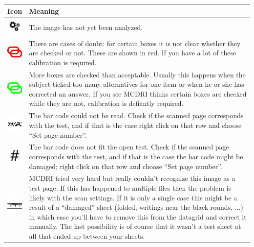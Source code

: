 \documentclass[10pt,a4paper]{article}
\newcommand{\name}{MCDRI }
\begin{document}
\begin{tabular}{l|p{}}
Icon & Meaning \\
\hline
\includegraphics{img/icons/NotAnalyzed.png} & \vspace{-20pt} The image has not yet been analyzed. \\
\includegraphics{img/icons/ContainsDoubts.png} & \vspace{-20pt} There are cases of doubt: for certain boxes it is not clear whether they are checked or not. These are shown in red. If you have a lot of these calibration is required.\\
\includegraphics{img/icons/ContainsTooManyChecked.png} & \vspace{-20pt} More boxes are checked than acceptable. Usually this happens when the subject ticked too many alternatives for one item or when he or she has corrected an answer. If you see \name thinks certain boxes are checked while they are not, calibration is defiantly required.\\
\includegraphics{img/icons/BarCodeError.png} & \vspace{-20pt} The bar code could not be read. Check if the scanned page corresponds with the test, and if that is the case right click on that row and choose ``Set page number''.\\
\includegraphics{img/icons/PageNumberOrHashError.png} & \vspace{-20pt}  The bar code does not fit the open test. Check if the scanned page corresponds with the test, and if that is the case the bar code might be damaged; right click on that row and choose ``Set page number''.\\
\includegraphics{img/icons/CalibrationError.png} & \vspace{-20pt} \name tried very hard but really couldn't recognize this image as a test page. If this has happened to multiple files then the problem is likely with the scan settings. If it is only a single case this might be a result of a ``damaged'' sheet (folded, writings near the black rounds, ...) in which case you'll have to remove this from the datagrid and correct it manually. The last possibility is of course that it wasn't a test sheet at all that ended up between your sheets. \\

\end{tabular}
\end{document}
